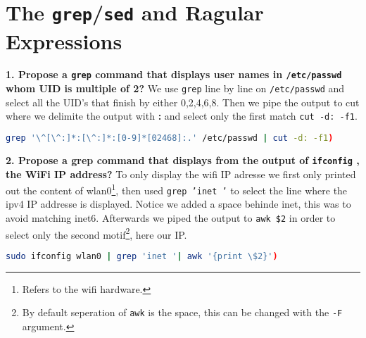 \documentclass[a4paper,oneside,onecolumn]{article}
\newcommand{\code}[1]{\colorbox{codegray}{\texttt{#1}}}
\begin{document}
\section*{The \code{grep}/\code{sed} and Ragular Expressions}

\noindent 
\textbf{1. Propose a \code{grep} command that displays user names in \texttt{/etc/passwd}
whom UID is multiple of 2?}
\newline
\newline
We use \code{grep} line by line on \texttt{/etc/passwd} and select all the UID's that finish by either 0,2,4,6,8. Then we pipe the output to cut where we delimite the output with \textbf{:} and select only the first match \code{cut -d: -f1}.
\begin{lstlisting}[language=bash,caption={bash version}]
grep '\^[\^:]*:[\^:]*:[0-9]*[02468]:.' /etc/passwd | cut -d: -f1)
\end{lstlisting}
\noindent
\textbf{2. Propose a grep command that displays  from the output of \code{ifconfig}
, the WiFi IP address?}
\newline
\newline
To only display the wifi IP adresse we first only printed out the content of wlan0\footnote{Refers to the wifi hardware.}, then used \code{grep 'inet '} to select the line where the ipv4 IP addresse is displayed. Notice we added a space behinde inet, this was to avoid matching inet6. Afterwards we piped the output to \code{awk \$2} in order to select only the second motif\footnote{By default seperation of \code{awk} is the space, this can be changed with the \code{-F} argument.}, here our IP.
\begin{lstlisting}[language=bash,caption={bash version}]
sudo ifconfig wlan0 | grep 'inet '| awk '{print \$2}')
\end{lstlisting}

\noindent
\end{document}
